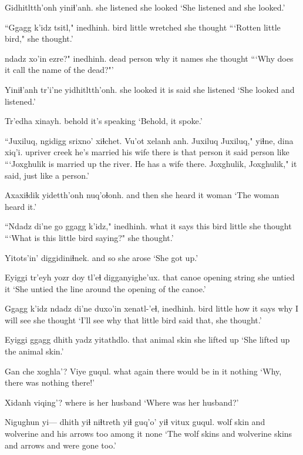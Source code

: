 \documentclass[12pt]{article}
\begin{document}
\gll Gidhitltth'onh yiniɬ'anh.
{she listened}  {she looked}
\glt `She listened and she looked.'
\glend 

\gll ``Ggagg k'idz tsitl,"  inedhinh.
bird  little wretched {she thought}
\glt ```Rotten little bird," she thought.'
\glend 

 {ndadz xo'in}  ezre?"  inedhinh.
{dead person} why   {it names}  {she thought}
\glt ```Why does it call the name of the dead?"'
\glend 

\gll Yiniɬ'anh tr'i'ne yidhitltth'onh.
{she looked} {it is said} {she listened}
\glt `She looked and listened.'
\glend 

\gll Tr'edha xinayh.
behold  {it's speaking}
\glt `Behold, it spoke.'
\glend 

\gll ``Juxiluq, ngidigg srixno' xiɬchet. Vu'ot  xelanh anh. {Juxiluq Juxiluq,"} yiɬne, dina xiq'i.
{}         upriver  creek  {he's married} {his wife} {there is} {that person} {} {it said} person like
\glt ```Joxghulik is married up the river. He has a wife there. Joxghulik, Joxghulik," it said, just like a person.'
\glend 

\gll Axaxiɬdik yidetth'onh nuq'oɬonh.
{and then} {she heard it} woman
\glt `The woman heard it.'
\glend 

\gll ``Ndadz di'ne go ggagg  k'idz," inedhinh.
what {it says} this bird  little  {she thought}
\glt ```What is this little bird saying?" she thought.'
\glend 

\gll Yitots'in' diggidiniɬnek.
{and so}  {she arose}
\glt `She got up.'
\glend 

\gll Eyiggi  {tr'eyh yozr} doy  tl'eɬ digganyighe'ux.
that  canoe  opening string {she untied it}
\glt `She untied the line around the opening of the canoe.'
\glend 

\gll Ggagg k'idz ndadz di'ne duxo'in xenatl-'eɬ, inedhinh.
bird  little how  {it says} why {I will see} {she thought}
\glt `I'll see why that little bird said that, she thought.'
\glend 

\gll Eyiggi  ggagg  dhith {yadz yitathdlo.}
that  animal  skin {she lifted up}
\glt `She lifted up the animal skin.'
\glend 

\gll Gan che xoghla'?  Viye guqul.
what again {there would be} {in it} nothing
\glt `Why, there was nothing there!'
\glend 

\gll Xidanh  viqing'?
{where is} {her husband}
\glt `Where was her husband?'
\glend 

\gll Nigughun yi--- dhith yiɬ niɬtreth yiɬ guq'o'  yiɬ vitux  guqul.
wolf {} skin and wolverine and {his arrows} too {among it} none
\glt `The wolf skins and wolverine skins and arrows and were gone too.'
\glend 
\end{document}
